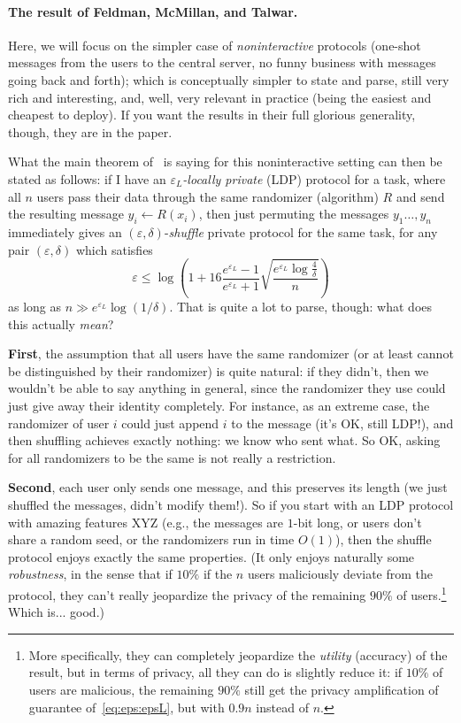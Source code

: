 \documentclass[11pt]{article}
\begin{document}
\paragraph{The result of Feldman, McMillan, and Talwar.}
Here, we will focus on the simpler case of \emph{noninteractive} protocols (one-shot messages from the users to the central server, no funny business with messages going back and forth); which is conceptually simpler to state and parse, still very rich and interesting, and, well, very relevant in practice (being the easiest and cheapest to deploy). If you want the results in their full glorious generality, though, they are in the paper.

What the main theorem of~\cite{FeldmanMT21} is saying for this noninteractive setting can then be stated as follows: if I have an \emph{$\varepsilon_{L}$-locally private} (LDP) protocol for a task, where all $n$ users pass their data through the same randomizer (algorithm) $R$ and send the resulting message $y_i \gets R(x_i)$, then just permuting the messages $y_1\dots,y_n$ immediately gives an $(\varepsilon,\delta)$-\emph{shuffle} private protocol for the same task, for any pair $(\varepsilon,\delta)$ which satisfies
\begin{equation}
	\label{eq:eps:epsL}
		\varepsilon \leq \log\!\left( 1+ 16\frac{e^{\varepsilon_{L}}-1}{e^{\varepsilon_{L}}+1}\sqrt{\frac{e^{\varepsilon_{L}}\log\frac{4}{\delta}}{n}}\right)
\end{equation}
as long as $n \gg e^{\varepsilon_{L}}\log(1/\delta)$. That is quite a lot to parse, though: what does this actually \emph{mean}?\medskip 

\textbf{First}, the assumption that all users have the same randomizer (or at least cannot be distinguished by their randomizer) is quite natural: if they didn't, then we wouldn't be able to say anything in general, since the randomizer they use could just give away their identity completely. For instance, as an extreme case, the randomizer of user $i$ could just append $i$ to the message (it's OK, still LDP!), and then shuffling achieves exactly nothing: we know who sent what. So OK, asking for all randomizers to be the same is not really a restriction.\medskip 

\textbf{Second}, each user only sends one message, and this preserves its length (we just shuffled the messages, didn't modify them!). So if you start with an LDP protocol with amazing features XYZ (e.g., the messages are $1$-bit long, or users don't share a random seed, or the randomizers run in time $O(1)$), then the shuffle protocol enjoys exactly the same properties. (It only enjoys naturally some \emph{robustness}, in the sense that if $10\%$ if the $n$ users maliciously deviate from the protocol, they can't really jeopardize the privacy of the remaining $90\%$ of users.\footnote{More specifically, they can completely jeopardize the \emph{utility} (accuracy) of the result, but in terms of privacy, all they can do is slightly reduce it: if $10\%$ of users are malicious, the remaining $90\%$ still get the privacy amplification of guarantee of~\eqref{eq:eps:epsL}, but with $0.9n$ instead of $n$.} Which is... good.)\medskip 
\end{document}
